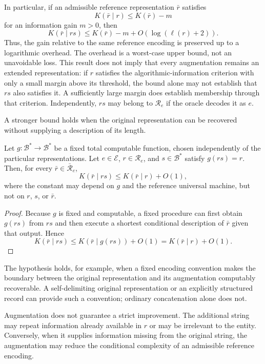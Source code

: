 In particular, if an admissible reference representation $\bar r$ satisfies
\[
K(\bar r\mid r)\leq K(\bar r)-m
\]
for an information gain $m>0$, then
\[
K(\bar r\mid rs)
\leq K(\bar r)-m+O(\log(\ell(r)+2)).
\]
Thus, the gain relative to the same reference encoding is preserved up to a logarithmic overhead. The overhead is a worst-case upper bound, not an unavoidable loss. This result does not imply that every augmentation remains an extended representation: if $r$ satisfies the algorithmic-information criterion with only a small margin above its threshold, the bound alone may not establish that $rs$ also satisfies it. A sufficiently large margin does establish membership through that criterion. Independently, $rs$ may belong to $\mathcal R_e$ if the oracle decodes it as $e$.

A stronger bound holds when the original representation can be recovered without supplying a description of its length.

\begin{proposition}
Let $g:\mathcal B^\ast\to\mathcal B^\ast$ be a fixed total computable function, chosen independently of the particular representations. Let $e\in\mathcal E$, $r\in\mathcal R_e$, and $s\in\mathcal B^\ast$ satisfy $g(rs)=r$. Then, for every $\bar r\in\bar{\mathcal R}_e$,
\[
K(\bar r\mid rs)\leq K(\bar r\mid r)+O(1),
\]
where the constant may depend on $g$ and the reference universal machine, but not on $r$, $s$, or $\bar r$.
\end{proposition}
\begin{proof}
Because $g$ is fixed and computable, a fixed procedure can first obtain $g(rs)$ from $rs$ and then execute a shortest conditional description of $\bar r$ given that output. Hence
\[
K(\bar r\mid rs)
\leq K(\bar r\mid g(rs))+O(1)
=K(\bar r\mid r)+O(1).
\]
\end{proof}

The hypothesis holds, for example, when a fixed encoding convention makes the boundary between the original representation and its augmentation computably recoverable. A self-delimiting original representation or an explicitly structured record can provide such a convention; ordinary concatenation alone does not.

Augmentation does not guarantee a strict improvement. The additional string may repeat information already available in $r$ or may be irrelevant to the entity. Conversely, when it supplies information missing from the original string, the augmentation may reduce the conditional complexity of an admissible reference encoding.

